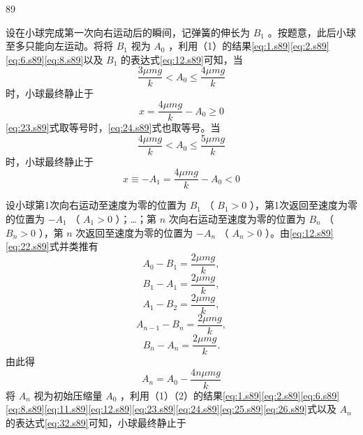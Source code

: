 \begin{solution}{89}
\begin{subsolution}
设在小球完成第一次向右运动后的瞬间，记弹簧的伸长为 $B_{1}$ 。按题意，此后小球至多只能向左运动。将将 $B_{1}$ 视为 $A_{0}$ ，利用（1）的结果\eqref{eq:1.s89}\eqref{eq:2.s89}\eqref{eq:6.s89}\eqref{eq:8.s89}以及 $B_{1}$ 的表达式\eqref{eq:12.s89}可知，当
\begin{equation}
\frac {3 \mu m g}{k} <   A _ {0} \leq \frac {4 \mu m g}{k}
\label{eq:23.s89}
\end{equation}
时，小球最终静止于
\begin{equation}
x = \frac {4 \mu m g}{k} - A _ {0} \geq 0
\label{eq:24.s89}
\end{equation}
\eqref{eq:23.s89}式取等号时，\eqref{eq:24.s89}式也取等号。当
\begin{equation}
\frac {4 \mu m g}{k} <   A _ {0} \leq \frac {5 \mu m g}{k}
\label{eq:25.s89}
\end{equation}
时，小球最终静止于
\begin{equation}
x \equiv - A _ {1} = \frac {4 \mu m g}{k} - A _ {0} <   0
\label{eq:26.s89}
\end{equation}
\end{subsolution}
\begin{subsolution}
设小球第1次向右运动至速度为零的位置为 $B_{1}$ （ $B_{1}>0$ ），第1次返回至速度为零的位置为 $-A_{1}$ （ $A_{1}>0$ ）；…；第 $n$ 次向右运动至速度为零的位置为 $B_{n}$ （ $B_{n}>0$ ），第 $n$ 次返回至速度为零的位置为 $-A_{n}$ （ $A_{n}>0$ ）。由\eqref{eq:12.s89}\eqref{eq:22.s89}式并类推有
\begin{equation}
A _ {0} - B _ {1} = \frac {2 \mu m g}{k},
\label{eq:27.s89}
\end{equation}
\begin{equation}
B _ {1} - A _ {1} = \frac {2 \mu m g}{k},
\label{eq:28.s89}
\end{equation}
\begin{equation}
A _ {1} - B _ {2} = \frac {2 \mu m g}{k},
\label{eq:29.s89}
\end{equation}
\begin{equation}
A _ {n - 1} - B _ {n} = \frac {2 \mu m g}{k},
\label{eq:30.s89}
\end{equation}
\begin{equation}
B _ {n} - A _ {n} = \frac {2 \mu m g}{k}.
\label{eq:31.s89}
\end{equation}
由此得
\begin{equation}
A _ {n} = A _ {0} - \frac {4 n \mu m g}{k}
\label{eq:32.s89}
\end{equation}
将 $A_{n}$ 视为初始压缩量 $A_{0}$ ，利用（1）（2）的结果\eqref{eq:1.s89}\eqref{eq:2.s89}\eqref{eq:6.s89}\eqref{eq:8.s89}\eqref{eq:11.s89}\eqref{eq:12.s89}\eqref{eq:23.s89}\eqref{eq:24.s89}\eqref{eq:25.s89}\eqref{eq:26.s89}式以及 $A_{n}$ 的表达式\eqref{eq:32.s89}可知，小球最终静止于

\end{subsolution}
\end{solution}
